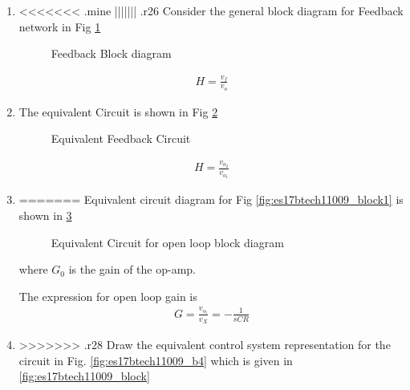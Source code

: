 \begin{enumerate}[label=\arabic*.,ref=\theenumi]
\begin{enumerate}[label=\arabic*.,ref=\theenumi]
\item
<<<<<<< .mine
||||||| .r26
Consider the general block diagram for Feedback network in Fig \ref{fig:es17btech11009_b3}
\renewcommand{\thefigure}{\theenumi.\arabic{figure}}
\begin{figure}[!ht]
	\begin{center}
		\resizebox{\columnwidth}{!}{}
	\end{center}
\caption{Feedback Block diagram}
\label{fig:es17btech11009_b3}
\end{figure}
\begin{align}
    H = \frac{v_{f}}{v_{o}}
\end{align}
\item 
The equivalent Circuit is shown in Fig \ref{fig:es17btech11009_fig3}
\renewcommand{\thefigure}{\theenumi.\arabic{figure}}
\begin{figure}[!ht]
	\begin{center}
		\resizebox{\columnwidth}{!}{}
	\end{center}
\caption{Equivalent Feedback Circuit}
\label{fig:es17btech11009_fig3}
\end{figure}

\begin{align}
    H = \frac{v_{o_2}}{v_{o_1}}
\end{align}
\item
=======
Equivalent circuit diagram for Fig \ref{fig:es17btech11009_block1} is shown in \ref{fig:es17btech11009_block2}
\renewcommand{\thefigure}{\theenumi.\arabic{figure}}
\begin{figure}[!ht]
	\begin{center}
		\resizebox{\columnwidth}{!}{}
	\end{center}
\caption{Equivalent Circuit for open loop block diagram}
\label{fig:es17btech11009_block2}
\end{figure}

where $G_{0}$ is the gain of the op-amp.

The expression for open loop gain is 
\begin{align}
    G = \frac{v_{o_1}}{v_{X}} = -\frac{1}{sCR}
    \label{eq:es17btech11009_G}
\end{align}

\item
>>>>>>> .r28
Draw the equivalent control system representation for the circuit in Fig. \ref{fig:es17btech11009_b4} which is given in \ref{fig:es17btech11009_block}


\end{enumerate}
\end{enumerate}
